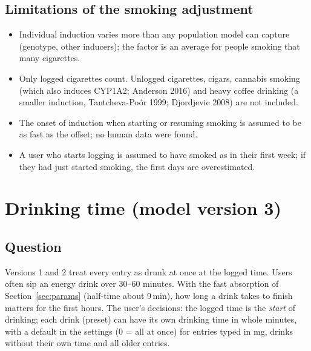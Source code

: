 \documentclass[10pt,a4paper]{article}
\begin{document}
\subsection{Limitations of the smoking adjustment}
\begin{itemize}
\item Individual induction varies more than any population model can capture (genotype, other inducers); the factor is
an average for people smoking that many cigarettes.
\item Only logged cigarettes count. Unlogged cigarettes, cigars, cannabis smoking (which also induces CYP1A2;
Anderson 2016) and heavy coffee drinking (a smaller induction, Tantcheva-Po\'or 1999; Djordjevic 2008) are not
included.
\item The onset of induction when starting or resuming smoking is assumed to be as fast as the offset; no human
data were found.
\item A user who starts logging is assumed to have smoked as in their first week; if they had just started smoking,
the first days are overestimated.
\end{itemize}

\section{Drinking time (model version 3)}
\label{sec:sip}
\subsection{Question}
Versions 1 and 2 treat every entry as drunk at once at the logged time. Users often sip an energy drink over
30--60 minutes. With the fast absorption of Section~\ref{sec:params} (half-time about 9\,min), how long a drink
takes to finish matters for the first hours. The user's decisions: the logged time is the \emph{start} of drinking;
each drink (preset) can have its own drinking time in whole minutes, with a default in the settings (0 = all at once)
for entries typed in mg, drinks without their own time and all older entries.
\end{document}

